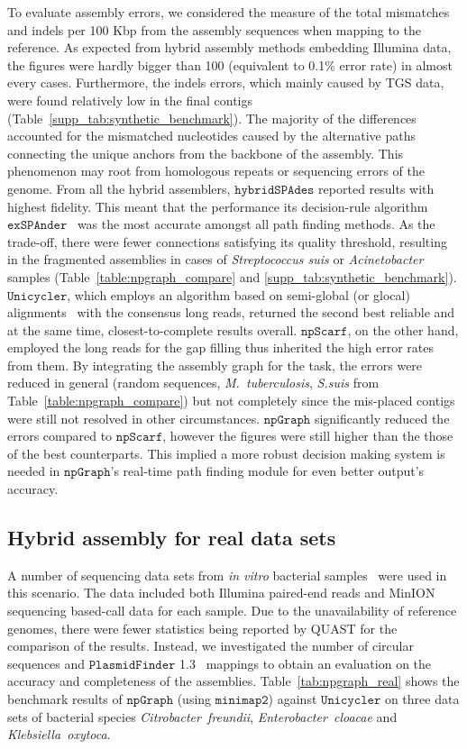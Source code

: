 \documentclass[10pt,twocolumn,twoside]{genpaper}
\newcommand{\npscarf}{$\mathtt{npScarf}$}
\newcommand{\npgraph}{$\mathtt{npGraph}$}
\newcommand{\unicycler}{$\mathtt{Unicycler}$}
\newcommand{\minimap}{$\mathtt{minimap2}$}
\begin{document}
To evaluate assembly errors, we considered the measure of the total mismatches and indels per 100 Kbp from the assembly sequences when mapping to the reference.
As expected from hybrid assembly methods embedding Illumina data, the figures were hardly bigger than 100 (equivalent to 0.1\% error rate) in almost every cases.
Furthermore, the indels errors, which mainly caused by TGS data, were found relatively low in the final contigs (Table~\ref{supp_tab:synthetic_benchmark}).
The majority of the differences accounted for the mismatched nucleotides caused by the alternative paths connecting the unique anchors from the backbone of the assembly.
This phenomenon may root from homologous repeats or sequencing errors of the genome.
From all the hybrid assemblers, $\mathtt{hybridSPAdes}$ reported results with highest fidelity. This meant that the performance its decision-rule algorithm $\mathtt{exSPAnder}$~\cite{Prjibelski2014} was the most accurate amongst all path finding methods. As the trade-off, there were fewer connections satisfying its quality threshold, resulting in the fragmented assemblies in cases of \emph{Streptococcus suis} or \emph{Acinetobacter} samples (Table~\ref{table:npgraph_compare} and \ref{supp_tab:synthetic_benchmark}).
\unicycler{}, which employs an algorithm based on semi-global (or glocal) alignments~\cite{Brudno2003glocal} with the consensus long reads, returned the second best reliable and at the same time, closest-to-complete results overall.
\npscarf{}, on the other hand, employed the long reads for the gap filling thus inherited the high error rates from them.
By integrating the assembly graph for the task, the errors were reduced in general (random sequences, \emph{M.~tuberculosis}, \emph{S.suis} from Table~\ref{table:npgraph_compare}) but not completely since the mis-placed contigs were still not resolved in other circumstances.
\npgraph{} significantly reduced the errors compared to \npscarf{}, however the figures were still higher than the those of the best counterparts.
This implied a more robust decision making system is needed in \npgraph{}'s real-time path finding module for even better output's accuracy.

\subsection*{Hybrid assembly for real data sets}
A number of sequencing data sets from \emph{in vitro} bacterial samples~\cite{George2017M14} were used in this scenario.
The data included both Illumina paired-end reads and MinION sequencing based-call data for each sample.
Due to the unavailability of reference genomes, there were fewer statistics being reported by QUAST for the comparison of the results. 
Instead, we investigated the number of circular sequences and $\mathtt{PlasmidFinder}$ 1.3~\cite{Carattoli2014} mappings to obtain an evaluation on the accuracy and completeness of the assemblies.
Table~\ref{tab:npgraph_real} shows the benchmark results of \npgraph{} (using \minimap{}) against \unicycler{} on three data sets of bacterial species \emph{Citrobacter~freundii}, \emph{Enterobacter~cloacae} and \emph{Klebsiella~oxytoca}. 
\end{document}
